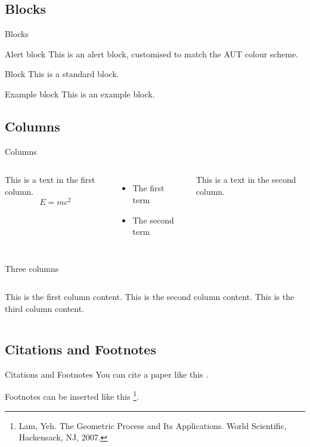 \documentclass[aspectratio=169, 12pt]{beamer}    %
\begin{document}
\subsection{Blocks}
\begin{frame}{Blocks}
    \begin{alertblock}{Alert block}
        This is an alert block, customised to match the AUT colour scheme.
        
    \end{alertblock}
    
    \begin{block}{Block}
        This is a standard block.
    \end{block}  

    \begin{exampleblock}{Example block}
        This is an example block.
    \end{exampleblock}  

\end{frame}


\subsection{Columns}
\begin{frame}{Columns}
    \begin{columns}
    This is a text in the first column.
    $$E = mc^2 $$
    \begin{itemize}
        \item The first term
        \item The second term
    \end{itemize}
    
    This is a text in the second column.
    \end{columns}
\end{frame}

\begin{frame}{Three columns}
    \begin{columns}
        This is the first column content.
        This is the second column content.
        This is the third column content.
    \end{columns}
\end{frame}


\subsection{Citations and Footnotes}
\begin{frame}{Citations and Footnotes}
You can cite a paper like this \cite{teichmann2019machine, buehler2019deep}. 

Footnotes can be inserted like this
\footnote[frame]{
Lam, Yeh. The Geometric Process and Its Applications. World Scientific, Hackensack,
NJ, 2007.
}.
\end{frame}
\end{document}
